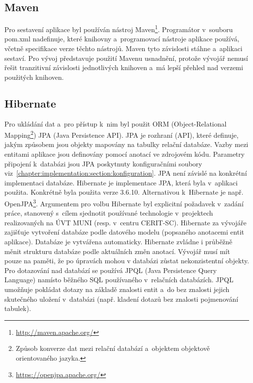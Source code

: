 \documentclass[11pt,draft,oneside]{fithesis2}
\begin{document}
\subsection{Maven}
Pro sestavení aplikace byl používán nástroj Maven\footnote{\url{http://maven.apache.org/}}. Programátor v~souboru pom.xml nadefinuje, které knihovny a~programovací nástroje aplikace používá, včetně specifikace verze těchto nástrojů. Maven tyto závislosti stáhne a~aplikaci sestaví. Pro vývoj představuje použití Mavenu usnadnění, protože vývojář nemusí řešit tranzitivní závislosti jednotlivých knihoven a~má lepší přehled nad verzemi použitých knihoven. 

\subsection{Hibernate}
Pro ukládání dat a~pro přístup k~nim byl použit ORM (Object-Relational Mapping\footnote{Způsob konverze dat mezi relační databází a~objektem objektově orientovaného jazyka.}) JPA (Java Persistence API). JPA je rozhraní (API), které definuje, jakým způsobem jsou objekty mapovány na tabulky relační databáze. Vazby mezi entitami aplikace jsou definovány pomocí anotací ve zdrojovém kódu. Parametry připojení k~databázi jsou JPA poskytnuty konfiguračními soubory viz~\ref{chapter:implementation:section:konfiguration}. JPA není závislé na konkrétní implementaci databáze.
Hibernate je implementace JPA, která byla v~aplikaci použita. Konkrétně byla použita verze 3.6.10. Alternativou k~Hibernate je např. OpenJPA\footnote{\url{https://openjpa.apache.org/}}. Argumentem pro volbu Hibernate byl explicitní požadavek v~zadání práce, stanovený s~cílem sjednotit používané technologie v~projektech realizovaných na ÚVT MUNI (resp. v~centru CERIT-SC). 
Hibernate za vývojáře zajišťuje vytvoření databáze podle datového modelu (popsaného anotacemi entit aplikace). Databáze je vytvářena automaticky. Hibernate zvládne i průběžně měnit strukturu databáze podle aktuálních změn anotací. Vývojář musí mít pouze na paměti, že po úpravách mohou v databázi zůstat nekonzistentní objekty.
Pro dotazování nad databází se používá JPQL (Java Persistence Query Language) namísto běžného SQL používaného v~relačních databázích. JPQL umožňuje pokládat dotazy na základě znalosti entit a~do bez znalosti jejich skutečného uložení v~databázi (např. kladení dotazů bez znalosti pojmenování tabulek).
\end{document}
